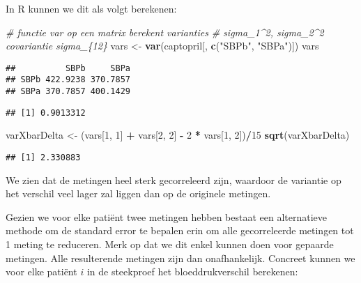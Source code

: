 \documentclass[
  12pt,dutch,coursenotes]{book}
\newenvironment{Shaded}{\begin{snugshade}}{\end{snugshade}}
\newcommand{\CommentTok}[1]{\textcolor[rgb]{0.56,0.35,0.01}{\textit{#1}}}
\newcommand{\DecValTok}[1]{\textcolor[rgb]{0.00,0.00,0.81}{#1}}
\newcommand{\KeywordTok}[1]{\textcolor[rgb]{0.13,0.29,0.53}{\textbf{#1}}}
\newcommand{\NormalTok}[1]{#1}
\newcommand{\OperatorTok}[1]{\textcolor[rgb]{0.81,0.36,0.00}{\textbf{#1}}}
\newcommand{\StringTok}[1]{\textcolor[rgb]{0.31,0.60,0.02}{#1}}
\theoremstyle{definition}
\theoremstyle{definition}
\theoremstyle{definition}
\theoremstyle{remark}
\begin{document}
In R kunnen we dit als volgt berekenen:

\begin{Shaded}
\begin{Highlighting}[]
\CommentTok{\# functie var op een matrix berekent varianties}
\CommentTok{\# sigma\_1\^{}2, sigma\_2\^{}2 covariantie sigma\_\{12\}}
\NormalTok{vars \textless{}{-}}\StringTok{ }\KeywordTok{var}\NormalTok{(captopril[, }\KeywordTok{c}\NormalTok{(}\StringTok{"SBPb"}\NormalTok{, }\StringTok{"SBPa"}\NormalTok{)])}
\NormalTok{vars}
\end{Highlighting}
\end{Shaded}

\begin{verbatim}
##          SBPb     SBPa
## SBPb 422.9238 370.7857
## SBPa 370.7857 400.1429
\end{verbatim}

\begin{Shaded}
\end{Shaded}

\begin{verbatim}
## [1] 0.9013312
\end{verbatim}

\begin{Shaded}
\begin{Highlighting}[]
\NormalTok{varXbarDelta \textless{}{-}}\StringTok{ }\NormalTok{(vars[}\DecValTok{1}\NormalTok{, }\DecValTok{1}\NormalTok{] }\OperatorTok{+}\StringTok{ }\NormalTok{vars[}\DecValTok{2}\NormalTok{, }\DecValTok{2}\NormalTok{] }\OperatorTok{{-}}\StringTok{ }\DecValTok{2} \OperatorTok{*}\StringTok{ }\NormalTok{vars[}\DecValTok{1}\NormalTok{, }
    \DecValTok{2}\NormalTok{])}\OperatorTok{/}\DecValTok{15}
\KeywordTok{sqrt}\NormalTok{(varXbarDelta)}
\end{Highlighting}
\end{Shaded}

\begin{verbatim}
## [1] 2.330883
\end{verbatim}

We zien dat de metingen heel sterk gecorreleerd zijn, waardoor de variantie op het verschil veel lager zal liggen dan op de originele metingen.

Gezien we voor elke patiënt twee metingen hebben bestaat een alternatieve methode om de standard error te bepalen erin om alle gecorreleerde metingen tot 1 meting te reduceren. Merk op dat we dit enkel kunnen doen voor gepaarde metingen. Alle resulterende metingen zijn dan onafhankelijk.
Concreet kunnen we voor elke patiënt \(i\) in de steekproef het bloeddrukverschil berekenen:
\end{document}
